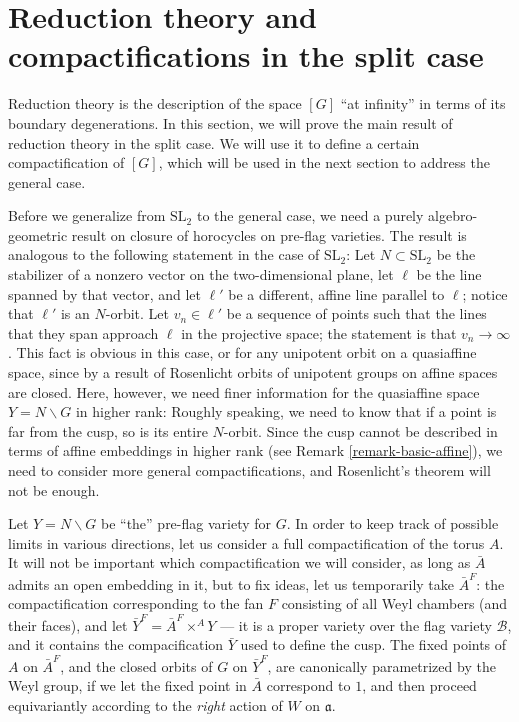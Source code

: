 




\section{Reduction theory and compactifications in the split case}
\label{section-reduction-theory-split}

Reduction theory is the description of the space $[G]$ ``at infinity'' in terms of its boundary degenerations. 
In this section, we will prove the main result of reduction theory in the split case. We will use it to define a certain compactification of $[G]$, which will be used in the next section to address the general case.

Before we generalize from $\text{SL}_2$ to the general case, we need a purely algebro-geometric result on closure of horocycles on pre-flag varieties. The result is analogous to the following statement in the case of $\text{SL}_2$: Let $N\subset \text{SL}_2$ be the stabilizer of a nonzero vector on the two-dimensional plane, let $\ell$ be the line spanned by that vector, and let $\ell'$ be a different, affine line parallel to $\ell$; notice that $\ell'$ is an $N$-orbit. Let $v_n \in \ell'$ be a sequence of points such that the lines that they span approach $\ell$ in the projective space; the statement is that $v_n\to \infty$. This fact is obvious in this case, or for any unipotent orbit on a quasiaffine space, since by a result of Rosenlicht \cite{Rosenlicht-quotient-varieties} orbits of unipotent groups on affine spaces are closed. Here, however, we need finer information for the quasiaffine space $Y=N\backslash G$ in higher rank: Roughly speaking, we need to know that if a point is far from the cusp, so is its entire $N$-orbit. Since the cusp cannot be described in terms of affine embeddings in higher rank (see Remark \ref{remark-basic-affine}), we need to consider more general compactifications, and Rosenlicht's theorem will not be enough.

Let $Y=N\backslash G$ be ``the'' pre-flag variety for $G$. In order to keep track of possible limits in various directions, let us consider a full compactification of the torus $A$. It will not be important which compactification we will consider, as long as $\bar A$ admits an open embedding in it, but to fix ideas, let us temporarily take $\bar A^F$: the compactification corresponding to the fan $F$ consisting of all Weyl chambers (and their faces), and let $\bar Y^F = \bar A^F \times^A Y$ --- it is a proper variety over the flag variety $\mathcal B$, and it contains the compacification $\bar Y$ used to define the cusp. The fixed points of $A$ on $\bar A^F$, and the closed orbits of $G$ on $\bar Y^F$, are canonically parametrized by the Weyl group, if we let the fixed point in $\bar A$ correspond to $1$, and then proceed equivariantly according to the \emph{right} action of $W$ on $\mathfrak a$. 


